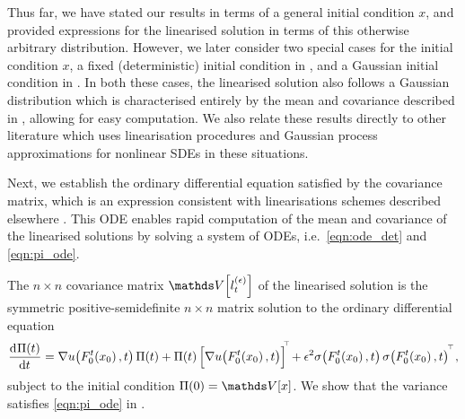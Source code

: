Thus far, we have stated our results in terms of a general initial condition \(x\), and provided expressions for the linearised solution in terms of this otherwise arbitrary distribution.
However, we later consider two special cases for the initial condition \(x\), a fixed (deterministic) initial condition in , and a Gaussian initial condition in .
In both these cases, the linearised solution also follows a Gaussian distribution which is characterised entirely by the mean and covariance described in , allowing for easy computation.
We also relate these results directly to other literature \citep{Jazwinski_2014_StochasticProcessesFiltering,FreidlinWentzell_1998_RandomPerturbationsDynamical,Blagoveshchenskii_1962_DiffusionProcessesDepending,Balasuriya_2020_StochasticSensitivityComputable,Sanz-AlonsoStuart_2017_GaussianApproximationsSmall,SarkkaSolin_2019_AppliedStochasticDifferential} which uses linearisation procedures and Gaussian process approximations for nonlinear SDEs in these situations.

Next, we establish the ordinary differential equation satisfied by the covariance matrix, which is an expression consistent with linearisations schemes described elsewhere \citep{ArchambeauEtAl_2007_GaussianProcessApproximations,SarkkaSolin_2019_AppliedStochasticDifferential,Jazwinski_2014_StochasticProcessesFiltering,Sanz-AlonsoStuart_2017_GaussianApproximationsSmall}.
This ODE enables rapid computation of the mean and covariance of the linearised solutions by solving a system of ODEs, i.e.\ \cref{eqn:ode_det} and \cref{eqn:pi_ode}.

\begin{remark}\label{rem:cov_ode}
	The \(n\times n\) covariance matrix \(\var{l_t^{(\epsilon)}}\) of the linearised solution is the symmetric positive-semidefinite \(n \times n\) matrix solution to the ordinary differential equation
	\begin{equation}
		\dod{\Pi(t)}{t} = \begin{multlined}[t]
			\nabla u\!\left(F_0^t\!\left(x_0\right), t\right) \Pi(t) + \Pi(t)\left[\nabla u\!\left(F_0^t\!\left(x_0\right), t\right)\right]^{\!\T}\! + \epsilon^2\sigma\!\left(F_0^t\!\left(x_0\right), t\right)\sigma\!\left(F_0^t\!\left(x_0\right), t\right)^{\T}\!,
		\end{multlined}
		\label{eqn:pi_ode}
	\end{equation}
	subject to the initial condition \(\Pi(0) = \var{x}\).
	We show that the variance satisfies \cref{eqn:pi_ode} in .
\end{remark}






